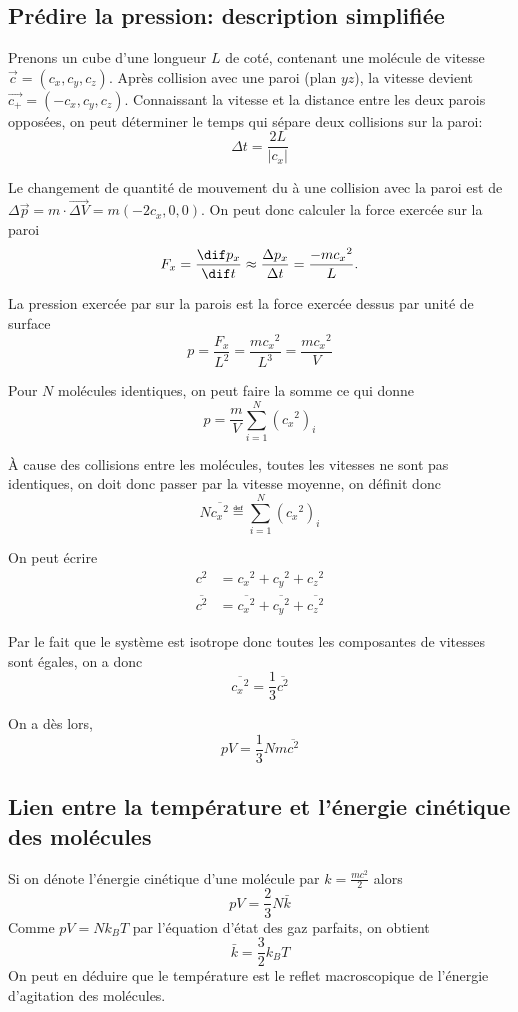 \subsection{Prédire la pression: description simplifiée}
Prenons un cube d'une longueur $L$ de coté,
contenant une molécule de vitesse $\vec{c} = (c_x, c_y, c_z)$.
Après collision avec une paroi (plan $yz$),
la vitesse devient $\vec{c_+} = (-c_x, c_y, c_z)$.
Connaissant la vitesse et la distance entre les deux parois opposées,
on peut déterminer le temps qui sépare deux collisions sur la paroi:
\[ \Delta t = \frac{2L}{|c_x|} \]

Le changement de quantité de mouvement du à une collision avec
la paroi est de $\Delta \vec{p} = m \cdot \vec{\Delta V} = m(-2c_x, 0, 0)$.
On peut donc calculer la force exercée sur la paroi
\[ F_x = \frac{\dif p_x}{\dif t} \approx
\frac{\Delta p_x}{\Delta t} = \frac{-m{c_x}^2}{L}. \]

La pression exercée par  sur la parois est
la force exercée dessus par unité de surface
\[ p = \frac{F_x}{L^2} = \frac{m{c_x}^2}{L^3} = \frac{m{c_x}^2}{V} \]

Pour $N$ molécules identiques, on peut faire la somme ce qui donne
\[ p = \frac{m}{V} \sum_{i=1}^{N}{({c_x}^2)_i} \]

À cause des collisions entre les molécules,
toutes les vitesses ne sont pas identiques,
on doit donc passer par la vitesse moyenne, on définit donc
\[ N \overline{{c_x}^2} \eqdef \sum_{i=1}^{N}{({c_x}^2)_i} \]

On peut écrire
\begin{align*}
  c^2 & = {c_x}^2 + {c_y}^2 + {c_z}^2\\
  \overline{c^2} & =
  \overline{{c_x}^2} + \overline{{c_y}^2} + \overline{{c_z}^2}
\end{align*}

Par le fait que le système est isotrope donc
toutes les composantes de vitesses sont égales, on a donc
\[  \overline{{c_x}^2} = \frac{1}{3}\overline{c^2} \]

On a dès lors,
\[ pV = \frac{1}{3}Nm\overline{c^2} \]


\subsection{Lien entre la température et l'énergie cinétique des molécules}
Si on dénote l'énergie cinétique d'une molécule par $k = \frac{mc^2}{2}$ alors
\[ pV = \frac 23 N\bar k \]
Comme $pV = Nk_BT$ par l'équation d'état des gaz parfaits, on obtient
\[ \bar k = \frac 32 k_B T \]
On peut en déduire que le température est
le reflet macroscopique de l'énergie d'agitation des molécules.

